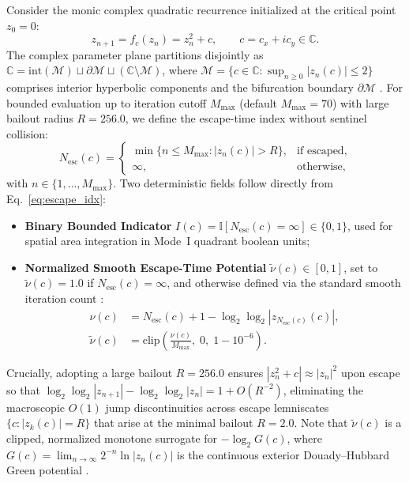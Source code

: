Consider the monic complex quadratic recurrence initialized at the critical point $z_0 = 0$:
\begin{equation}
\label{eq:quad_map}
z_{n+1} = f_c(z_n) = z_n^2 + c, \qquad c = c_x + i c_y \in \mathbb{C}.
\end{equation}
The complex parameter plane partitions disjointly as $\mathbb{C} = \mathrm{int}(\mathcal{M}) \sqcup \partial\mathcal{M} \sqcup (\mathbb{C}\setminus\mathcal{M})$, where $\mathcal{M} = \{c\in\mathbb{C} : \sup_{n\ge 0}|z_n(c)| \le 2\}$ comprises interior hyperbolic components and the bifurcation boundary $\partial\mathcal{M}$ \cite{douady1984etude,milnor2006dynamics}. For bounded evaluation up to iteration cutoff $M_{\max}$ (default $M_{\max}=70$) with large bailout radius $R = 256.0$, we define the escape-time index without sentinel collision:
\begin{equation}
\label{eq:escape_idx}
N_{\mathrm{esc}}(c) =
\begin{cases}
\min\bigl\{n \le M_{\max} : |z_n(c)| > R\bigr\}, & \text{if escaped}, \\
\infty, & \text{otherwise},
\end{cases}
\end{equation}
with $n \in \{1,\dots,M_{\max}\}$. Two deterministic fields follow directly from Eq.~\eqref{eq:escape_idx}:
\begin{itemize}
    \item \textbf{Binary Bounded Indicator} $I(c) = \mathbb{I}[N_{\mathrm{esc}}(c) = \infty] \in \{0,1\}$, used for spatial area integration in Mode~I quadrant boolean units;
    \item \textbf{Normalized Smooth Escape-Time Potential} $\tilde{\nu}(c) \in [0,1]$, set to $\tilde{\nu}(c)=1.0$ if $N_{\mathrm{esc}}(c)=\infty$, and otherwise defined via the standard smooth iteration count \cite{douady1984etude,milnor2006dynamics}:
    \begin{align}
    \label{eq:smooth_nu}
    \nu(c) &= N_{\mathrm{esc}}(c) + 1 - \log_2 \log_2 |z_{N_{\mathrm{esc}}(c)}(c)|, \nonumber \\
    \tilde{\nu}(c) &= \mathrm{clip}\!\left(\frac{\nu(c)}{M_{\max}}, \; 0, \; 1 - 10^{-6}\right).
    \end{align}
\end{itemize}
Crucially, adopting a large bailout $R=256.0$ ensures $|z_n^2+c| \approx |z_n|^2$ upon escape so that $\log_2\log_2|z_{n+1}| - \log_2\log_2|z_n| = 1 + O(R^{-2})$, eliminating the macroscopic $O(1)$ jump discontinuities across escape lemniscates $\{c : |z_k(c)|=R\}$ that arise at the minimal bailout $R=2.0$. Note that $\tilde{\nu}(c)$ is a clipped, normalized monotone surrogate for $-\log_2 G(c)$, where $G(c)=\lim_{n\to\infty} 2^{-n}\ln|z_n(c)|$ is the continuous exterior Douady--Hubbard Green potential \cite{douady1984etude}.


